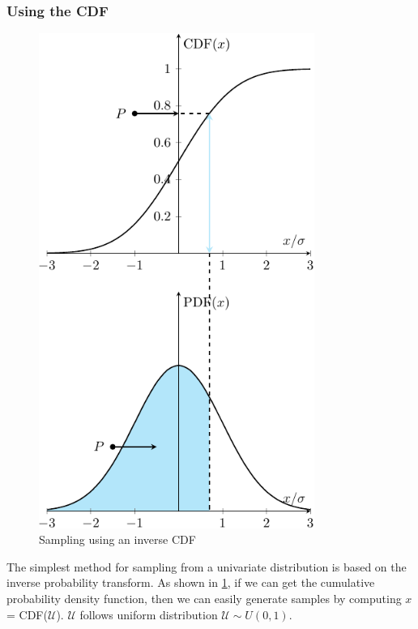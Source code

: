\subsubsection{Using the CDF}

\begin{figure}[H]
    \centering
    \includegraphics[width = 90mm]{Figures/figure-CDF.pdf}
    \caption{Sampling using an inverse CDF}
    \label{fig: CDF}
\end{figure}

The simplest method for sampling from a univariate distribution is based on the inverse probability transform. As shown in \cref{fig: CDF}, if we can get the cumulative probability density function, then we can easily generate samples by computing $x$ = CDF($\mathcal{U}$). $\mathcal{U}$ follows uniform distribution $\mathcal{U} \sim U(0,1)$.




